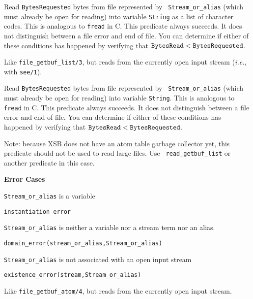 \begin{description}

Read {\tt BytesRequested} bytes from file represented by {\tt
Stream\_or\_alias} (which must already be open for reading) into
variable {\tt String} as a list of character codes. This is analogous
to {\tt fread} in C.  This predicate always succeeds. It does not
distinguish between a file error and end of file.  You can determine
if either of these conditions has happened by verifying that $\tt
BytesRead < BytesRequested$.

%
Like \verb|file_getbuf_list/3|, but reads from the currently open input stream
({\it i.e.}, with {\tt see/1}).



Read {\tt BytesRequested} bytes from file represented by {\tt
Stream\_or\_alias} (which must already be open for reading) into
variable {\tt String}. This is analogous to {\tt fread} in C.  This
predicate always succeeds. It does not distinguish between a file
error and end of file.  You can determine if either of these
conditions has happened by verifying that $\tt BytesRead <
BytesRequested$.

Note: because XSB does not have an atom table garbage collector yet,
this predicate should not be used to read large files.  Use {\tt
read\_getbuf\_list} or another predicate in this case.

{\bf Error Cases} 
\bi
\item 	{\tt Stream\_or\_alias} is a variable
\bi
\item {\tt instantiation\_error}
\ei
\item 	{\tt Stream\_or\_alias} is neither a variable nor a stream term nor an alias.
\bi
\item 	{\tt domain\_error(stream\_or\_alias,Stream\_or\_alias)}
\ei
\item 	{\tt Stream\_or\_alias} is not associated with an open input stream
\bi
\item 	{\tt existence\_error(stream,Stream\_or\_alias)}
\ei
\ei

%
Like \verb|file_getbuf_atom/4|, but reads from the currently open input stream.


\end{description}
